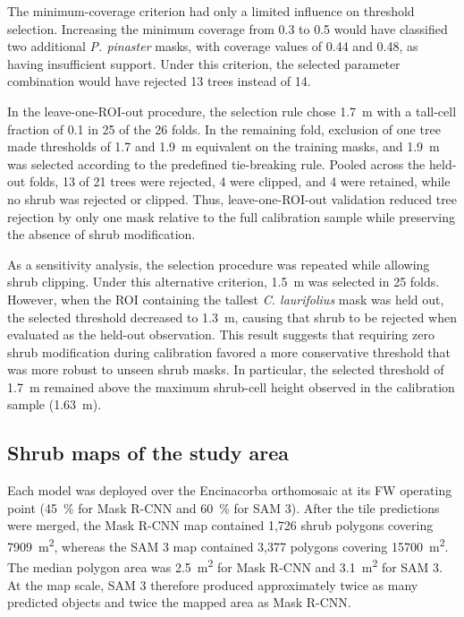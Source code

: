 \documentclass[12pt,a4paper]{article}
\begin{document}
The minimum-coverage criterion had only a limited influence on threshold selection. Increasing the minimum coverage from 0.3 to 0.5 would have classified two additional \textit{P. pinaster} masks, with coverage values of 0.44 and 0.48, as having insufficient support. Under this criterion, the selected parameter combination would have rejected 13 trees instead of 14.

In the leave-one-ROI-out procedure, the selection rule chose \qty{1.7}{\metre} with a tall-cell fraction of 0.1 in 25 of the 26 folds. In the remaining fold, exclusion of one tree made thresholds of 1.7 and \qty{1.9}{\metre} equivalent on the training masks, and \qty{1.9}{\metre} was selected according to the predefined tie-breaking rule. Pooled across the held-out folds, 13 of 21 trees were rejected, 4 were clipped, and 4 were retained, while no shrub was rejected or clipped. Thus, leave-one-ROI-out validation reduced tree rejection by only one mask relative to the full calibration sample while preserving the absence of shrub modification.

As a sensitivity analysis, the selection procedure was repeated while allowing shrub clipping. Under this alternative criterion, \qty{1.5}{\metre} was selected in 25 folds. However, when the ROI containing the tallest \textit{C. laurifolius} mask was held out, the selected threshold decreased to \qty{1.3}{\metre}, causing that shrub to be rejected when evaluated as the held-out observation. This result suggests that requiring zero shrub modification during calibration favored a more conservative threshold that was more robust to unseen shrub masks. In particular, the selected threshold of \qty{1.7}{\metre} remained above the maximum shrub-cell height observed in the calibration sample (\qty{1.63}{\metre}).

\subsection{Shrub maps of the study area}

Each model was deployed over the Encinacorba orthomosaic at its FW operating point (\qty{45}{\percent} for Mask R-CNN and \qty{60}{\percent} for SAM 3). After the tile predictions were merged, the Mask R-CNN map contained 1,726 shrub polygons covering \qty{7909}{\square\metre}, whereas the SAM 3 map contained 3,377 polygons covering \qty{15700}{\square\metre}. The median polygon area was \qty{2.5}{\square\metre} for Mask R-CNN and \qty{3.1}{\square\metre} for SAM 3. At the map scale, SAM 3 therefore produced approximately twice as many predicted objects and twice the mapped area as Mask R-CNN.
\end{document}
